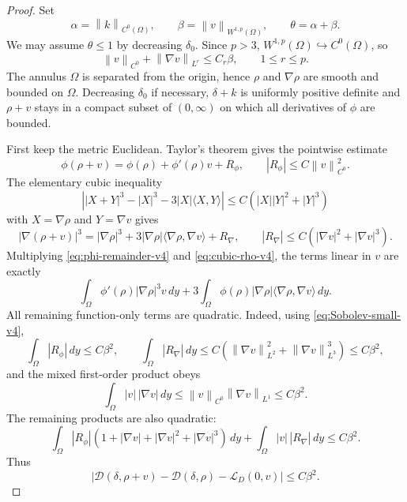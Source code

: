 \documentclass[11pt]{amsart}
\numberwithin{equation}{section}
\theoremstyle{definition}
\newcommand{\Dfun}{\mathscr D}
\newcommand{\rhoE}{\rho}
\newcommand{\LD}{\mathcal L_D}
\newcommand{\ip}[2]{\langle #1,#2\rangle}
\newcommand{\norm}[1]{\left\lVert #1\right\rVert}
\begin{document}
\begin{proof}
Set
$$
        \alpha=\norm{k}_{C^0(\Omega)},\qquad
        \beta=\norm{v}_{W^{1,p}(\Omega)},\qquad
        \theta=\alpha+\beta.
$$
We may assume $\theta\le1$ by decreasing $\delta_0$.  Since $p>3$,
$W^{1,p}(\Omega)\hookrightarrow C^0(\Omega)$, so
\begin{equation}\label{eq:Sobolev-small-v4}
        \norm{v}_{C^0}+\norm{\nabla v}_{L^r}
        \le C_r\beta,
        \qquad 1\le r\le p.
\end{equation}
The annulus $\Omega$ is separated from the origin, hence $\rhoE$ and $\nabla\rhoE$ are smooth and bounded on $\Omega$.  Decreasing $\delta_0$ if necessary, $\delta+k$ is uniformly positive definite and $\rhoE+v$ stays in a compact subset of $(0,\infty)$ on which all derivatives of $\phi$ are bounded.

First keep the metric Euclidean.  Taylor's theorem gives the pointwise estimate
\begin{equation}\label{eq:phi-remainder-v4}
        \phi(\rhoE+v)=\phi(\rhoE)+\phi'(\rhoE)v+R_\phi,
        \qquad |R_\phi|\le C\norm{v}_{C^0}^2.
\end{equation}
The elementary cubic inequality
\begin{equation}\label{eq:cubic-estimate-v4}
        \left||X+Y|^3-|X|^3-3|X|\ip{X}{Y}\right|
        \le C(|X||Y|^2+|Y|^3)
\end{equation}
with $X=\nabla\rhoE$ and $Y=\nabla v$ gives
\begin{equation}\label{eq:cubic-rho-v4}
        |\nabla(\rhoE+v)|^3
        =|\nabla\rhoE|^3
        +3|\nabla\rhoE|\ip{\nabla\rhoE}{\nabla v}
        +R_\nabla,
        \qquad
        |R_\nabla|\le C(|\nabla v|^2+|\nabla v|^3).
\end{equation}
Multiplying \eqref{eq:phi-remainder-v4} and \eqref{eq:cubic-rho-v4}, the terms linear in $v$ are exactly
$$
        \int_\Omega \phi'(\rhoE)|\nabla\rhoE|^3v\,dy
        +3\int_\Omega \phi(\rhoE)|\nabla\rhoE|
        \ip{\nabla\rhoE}{\nabla v}\,dy.
$$
All remaining function-only terms are quadratic.  Indeed, using \eqref{eq:Sobolev-small-v4},
$$
        \int_\Omega |R_\phi|\,dy\le C\beta^2,
        \qquad
        \int_\Omega |R_\nabla|\,dy
        \le C(\norm{\nabla v}_{L^2}^2+\norm{\nabla v}_{L^3}^3)
        \le C\beta^2,
$$
and the mixed first-order product obeys
$$
        \int_\Omega |v|\,|\nabla v|\,dy
        \le \norm{v}_{C^0}\norm{\nabla v}_{L^1}
        \le C\beta^2.
$$
The remaining products are also quadratic:
$$
        \int_\Omega |R_\phi|(1+|\nabla v|+|\nabla v|^2+|\nabla v|^3)\,dy
        +\int_\Omega |v|\,|R_\nabla|\,dy
        \le C\beta^2.
$$
Thus
\begin{equation}\label{eq:function-only-quadratic-v4}
        \left|\Dfun(\delta,\rhoE+v)-\Dfun(\delta,\rhoE)-\LD(0,v)\right|
        \le C\beta^2.
\end{equation}


\end{proof}
\end{document}
